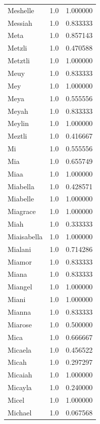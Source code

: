 \documentclass[
  letterpaper,
  DIV=11,
  numbers=noendperiod]{scrreprt}
\begin{document}
\begin{tabular}{lrr}
Meshelle        &   1.0 &   1.000000 \\
Messiah         &   1.0 &   0.833333 \\
Meta            &   1.0 &   0.857143 \\
Metzli          &   1.0 &   0.470588 \\
Metztli         &   1.0 &   1.000000 \\
Meuy            &   1.0 &   0.833333 \\
Mey             &   1.0 &   1.000000 \\
Meya            &   1.0 &   0.555556 \\
Meyah           &   1.0 &   0.833333 \\
Meylin          &   1.0 &   1.000000 \\
Meztli          &   1.0 &   0.416667 \\
Mi              &   1.0 &   0.555556 \\
Mia             &   1.0 &   0.655749 \\
Miaa            &   1.0 &   1.000000 \\
Miabella        &   1.0 &   0.428571 \\
Miabelle        &   1.0 &   1.000000 \\
Miagrace        &   1.0 &   1.000000 \\
Miah            &   1.0 &   0.333333 \\
Miaisabella     &   1.0 &   1.000000 \\
Mialani         &   1.0 &   0.714286 \\
Miamor          &   1.0 &   0.833333 \\
Miana           &   1.0 &   0.833333 \\
Miangel         &   1.0 &   1.000000 \\
Miani           &   1.0 &   1.000000 \\
Mianna          &   1.0 &   0.833333 \\
Miarose         &   1.0 &   0.500000 \\
Mica            &   1.0 &   0.666667 \\
Micaela         &   1.0 &   0.456522 \\
Micah           &   1.0 &   0.297297 \\
Micaiah         &   1.0 &   1.000000 \\
Micayla         &   1.0 &   0.240000 \\
Micel           &   1.0 &   1.000000 \\
Michael         &   1.0 &   0.067568 \\

\end{tabular}
\end{document}
